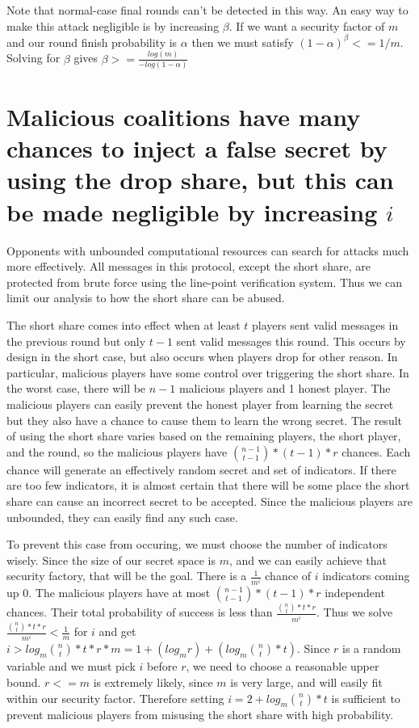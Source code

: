 \documentclass{dalcsthesis}
\begin{document}
Note that normal-case final rounds can't be detected in this way. An easy way to make this attack negligible is by increasing $\beta$. If we want a security factor of $m$ and our round finish probability is $\alpha$ then we must satisfy $(1 - \alpha)^\beta <= 1/m$. Solving for $\beta$ gives $\beta >= \frac{log(m)}{-log(1 - \alpha)}$

\section{Malicious coalitions have many chances to inject a false secret by using the drop share, but this can be made negligible by increasing $i$}

Opponents with unbounded computational resources can search for attacks much more effectively. All messages in this protocol, except the short share, are protected from brute force using the line-point verification system. Thus we can limit our analysis to how the short share can be abused.

The short share comes into effect when at least $t$ players sent valid messages in the previous round but only $t-1$ sent valid messages this round. This occurs by design in the short case, but also occurs when players drop for other reason. In particular, malicious players have some control over triggering the short share. In the worst case, there will be $n-1$ malicious players and 1 honest player. The malicious players can easily prevent the honest player from learning the secret but they also have a chance to cause them to learn the wrong secret. The result of using the short share varies based on the remaining players, the short player, and the round, so the malicious players have ${n-1 \choose t-1}*(t-1)*r$ chances. Each chance will generate an effectively random secret and set of indicators. If there are too few indicators, it is almost certain that there will be some place the short share can cause an incorrect secret to be accepted. Since the malicious players are unbounded, they can easily find any such case.

To prevent this case from occuring, we must choose the number of indicators wisely. Since the size of our secret space is $m$, and we can easily achieve that security factory, that will be the goal. There is a $\frac{1}{m^i}$ chance of $i$ indicators coming up 0. The malicious players have at most ${n-1 \choose t-1}*(t-1)*r$ independent chances. Their total probability of success is less than $\frac{{n \choose t}*t*r}{m^i}$. Thus we solve $\frac{{n \choose t}*t*r}{m^i} < \frac{1}{m}$ for $i$ and get $i > log_m {n \choose t}*t*r*m = 1 + (log_m r) + (log_m {n \choose t}*t)$. Since $r$ is a random variable and we must pick $i$ before $r$, we need to choose a reasonable upper bound. $r <= m$ is extremely likely, since $m$ is very large, and will easily fit within our security factor. Therefore setting $i = 2 + log_m {n \choose t}*t$ is sufficient to prevent malicious players from misusing the short share with high probability.
\end{document}
